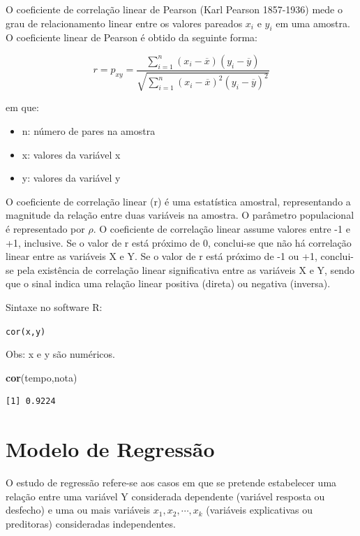 \documentclass[12pt,brazil,oneside]{book}
\newenvironment{Shaded}{\begin{snugshade}}{\end{snugshade}}
\newcommand{\KeywordTok}[1]{\textcolor[rgb]{0.13,0.29,0.53}{\textbf{#1}}}
\newcommand{\NormalTok}[1]{#1}
\providecommand{\tightlist}{%
  \setlength{\itemsep}{0pt}\setlength{\parskip}{0pt}}
\begin{document}
O coeficiente de correlação linear de Pearson (Karl Pearson 1857-1936) mede o grau de relacionamento linear entre os valores pareados \(x_i\) e \(y_i\) em uma amostra. O coeficiente linear de Pearson é obtido da seguinte forma:

\[
r = p_{xy} = \frac{\sum_{i=1}^{n} (x_i - \overline{x})(y_i - \overline{y})}
{\sqrt{\sum_{i=1}^{n} (x_i - \overline{x})^2(y_i - \overline{y})^2}}
\]

em que:

\begin{itemize}
\tightlist
\item
  n: número de pares na amostra
\item
  x: valores da variável x
\item
  y: valores da variável y
\end{itemize}

O coeficiente de correlação linear (r) é uma estatística amostral, representando a magnitude da relação entre duas variáveis na amostra. O parâmetro populacional é representado por \(\rho\). O coeficiente de correlação linear assume valores entre -1 e +1, inclusive. Se o valor de r está próximo de 0, conclui-se que não há correlação linear entre as variáveis X e Y. Se o valor de r está próximo de -1 ou +1, conclui-se pela existência de correlação linear significativa entre as variáveis X e Y, sendo que o sinal indica uma relação linear positiva (direta) ou negativa (inversa).

Sintaxe no software R:

\texttt{cor(x,y)}

Obs: x e y são numéricos.

\begin{Shaded}
\begin{Highlighting}[]
\KeywordTok{cor}\NormalTok{(tempo,nota)}
\end{Highlighting}
\end{Shaded}

\begin{verbatim}
[1] 0.9224
\end{verbatim}

\hypertarget{modelo-de-regressao}{%
\section{Modelo de Regressão}\label{modelo-de-regressao}}

O estudo de regressão refere-se aos casos em que se pretende estabelecer uma relação entre uma variável Y considerada dependente (variável resposta ou desfecho) e uma ou mais variáveis \(x_1, x_2,\cdots, x_k\) (variáveis explicativas ou preditoras) consideradas independentes.
\end{document}
